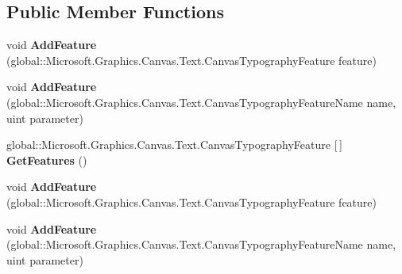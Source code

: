 \subsection*{Public Member Functions}
\begin{DoxyCompactItemize}
\item 
\mbox{\label{interface_microsoft_1_1_graphics_1_1_canvas_1_1_text_1_1_i_canvas_typography_a411e4a2a41c0157396db12ec2acab31d}} 
void {\bfseries Add\+Feature} (global\+::\+Microsoft.\+Graphics.\+Canvas.\+Text.\+Canvas\+Typography\+Feature feature)
\item 
\mbox{\label{interface_microsoft_1_1_graphics_1_1_canvas_1_1_text_1_1_i_canvas_typography_a2c8dc7baaa1737f81e1d72911b2e12ab}} 
void {\bfseries Add\+Feature} (global\+::\+Microsoft.\+Graphics.\+Canvas.\+Text.\+Canvas\+Typography\+Feature\+Name name, uint parameter)
\item 
\mbox{\label{interface_microsoft_1_1_graphics_1_1_canvas_1_1_text_1_1_i_canvas_typography_af297984550baf8fc4cbe7241965025ca}} 
global\+::\+Microsoft.\+Graphics.\+Canvas.\+Text.\+Canvas\+Typography\+Feature \mbox{[}$\,$\mbox{]} {\bfseries Get\+Features} ()
\item 
\mbox{\label{interface_microsoft_1_1_graphics_1_1_canvas_1_1_text_1_1_i_canvas_typography_a411e4a2a41c0157396db12ec2acab31d}} 
void {\bfseries Add\+Feature} (global\+::\+Microsoft.\+Graphics.\+Canvas.\+Text.\+Canvas\+Typography\+Feature feature)
\item 
\mbox{\label{interface_microsoft_1_1_graphics_1_1_canvas_1_1_text_1_1_i_canvas_typography_a2c8dc7baaa1737f81e1d72911b2e12ab}} 
void {\bfseries Add\+Feature} (global\+::\+Microsoft.\+Graphics.\+Canvas.\+Text.\+Canvas\+Typography\+Feature\+Name name, uint parameter)
\item 
\mbox{\label{interface_microsoft_1_1_graphics_1_1_canvas_1_1_text_1_1_i_canvas_typography_af297984550baf8fc4cbe7241965025ca}} 

\end{DoxyCompactItemize}
